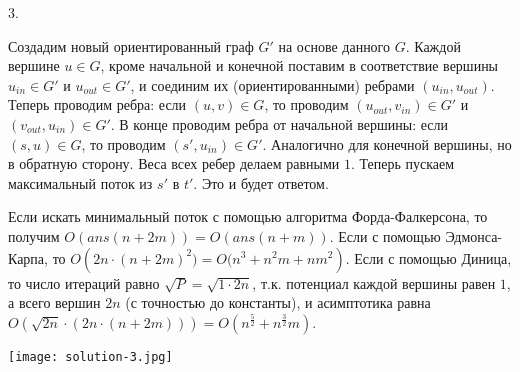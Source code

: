 3.

Создадим новый ориентированный граф $G'$ на основе данного $G$. Каждой вершине $u \in G$, кроме начальной и конечной поставим в соответствие вершины $u_{in} \in G'$ и $u_{out} \in G'$, и соединим их (ориентированными) ребрами $(u_{in}, u_{out})$. Теперь проводим ребра: если $(u, v) \in G$, то проводим $(u_{out}, v_{in}) \in G'$ и $(v_{out}, u_{in}) \in G'$. В конце проводим ребра от начальной вершины: если $(s, u) \in G$, то проводим $(s', u_{in}) \in G'$. Аналогично для конечной вершины, но в обратную сторону. Веса всех ребер делаем равными $1$. Теперь пускаем максимальный поток из $s'$ в $t'$. Это и будет ответом.

Если искать минимальный поток с помощью алгоритма Форда-Фалкерсона, то получим $O(\mathit{ans}(n + 2m)) = O(\mathit{ans}(n + m))$. Если с помощью Эдмонса-Карпа, то $O\left(2n \cdot (n + 2m)^2) = O(n^3 + n^2 m + nm^2\right)$. Если с помощью Диница, то число итераций равно $\sqrt{P} = \sqrt{1 \cdot 2n}$, т.к. потенциал каждой вершины равен $1$, а всего вершин $2n$ (с точностью до константы), и асимптотика равна $O\left(\sqrt{2n} \cdot (2n \cdot (n + 2m))\right) = O\left(n^{\frac{5}{2}} + n^{\frac{3}{2}} m\right)$.

\begin{center}
\texttt{[image: solution-3.jpg]}
\end{center}
